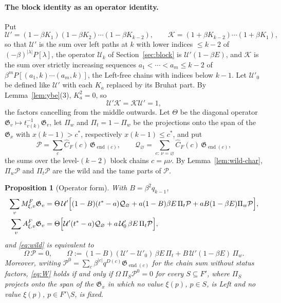 \documentclass[11pt]{article}
\newtheorem{proposition}{Proposition}
\newcommand{\G}{\mathfrak{G}}
\begin{document}
\paragraph{The block identity as an operator identity.}
Put
\[
 \mathcal U'=(1-\beta K_1)(1-\beta K_2)\cdots(1-\beta K_{k-2}),\qquad
 \mathcal K=(1+\beta K_{k-2})\cdots(1+\beta K_1),
\]
so that $\mathcal U'$ is the sum over left paths at $k$ with lower
indices $\leq k-2$ of $(-\beta)^{|\lambda|}P[\lambda]$, the operator
$\mathcal U_k$ of Section~\ref{sec:block} is $\mathcal U'(1-\beta E)$,
and $\mathcal K$ is the sum over strictly increasing sequences
$a_1<\cdots<a_m\leq k-2$ of $\beta^mP[(a_1,k)\cdots(a_m,k)]$, the
Left-free chains with indices below $k-1$. Let $\mathcal U'_0$ be
defined like $\mathcal U'$ with each $K_a$ replaced by its Bruhat
part. By Lemma~\ref{lem:ybe}(3), $K_a^2=0$, so
\begin{equation}\label{eq:UK}
 \mathcal U'\mathcal K=\mathcal K\mathcal U'=1,
\end{equation}
the factors cancelling from the middle outwards. Let $\Theta$ be the
diagonal operator $\G_v\mapsto t^{-1}_{v(k)}\G_v$, let $\Pi_w$ and
$\Pi_t=1-\Pi_w$ be the projections onto the span of the $\G_x$ with
$x(k-1)>c^\ast$, respectively $x(k-1)\leq c^\ast$, and put
\[
 \mathcal P=\sum_{c}\widehat C_F(c)\,\G_{\operatorname{end}(c)},\qquad
 \mathcal Q_\varnothing=\sum_{c:\ \nu=\varnothing}\widehat C_F(c)\,\G_{\operatorname{end}(c)},
\]
the sums over the level-$(k-2)$ block chains $c=\mu\nu$. By
Lemma~\ref{lem:wild-char}, $\Pi_w\mathcal P$ and $\Pi_t\mathcal P$
are the wild and the tame parts of $\mathcal P$.

\begin{proposition}[Operator form]\label{prop:operator-form}
With $B=\beta^2q_{k-1}$,
\begin{align}
 \sum_vM^F_{\xi,v}\G_v&=\Theta\,\mathcal U'\Bigl[(1-B)(t^\ast-a)\mathcal Q_\varnothing
  +a(1-B)\beta E\,\Pi_t\mathcal P+aB(1-\beta E)\Pi_w\mathcal P\Bigr],
  \label{eq:M-operator}\\
 \sum_vA^F_{\xi,v}\G_v&=\Theta\Bigl[\mathcal U'(t^\ast-a)\mathcal Q_\varnothing
  +a\,\mathcal U'_0\,\beta E\,\Pi_t\mathcal P\Bigr],\label{eq:A-operator}
\end{align}
and \eqref{eq:wild} is equivalent to
\begin{equation}\label{eq:W}
 \Omega\,\mathcal P=0,\qquad
 \Omega:=(1-B)(\mathcal U'-\mathcal U'_0)\,\beta E\,\Pi_t+B\,\mathcal U'(1-\beta E)\,\Pi_w .
\end{equation}
Moreover, writing $\mathcal P^0=\sum_c\beta^{|c|}q^{D(c)}\G_{\operatorname{end}(c)}$
for the chain sum without status factors, \eqref{eq:W} holds if and
only if $\Omega\,\Pi_S\mathcal P^0=0$ for every $S\subseteq F'$, where
$\Pi_S$ projects onto the span of the $\G_x$ in which no value
$\xi(p)$, $p\in S$, is Left and no value $\xi(p)$, $p\in F'\setminus S$,
is fixed.
\end{proposition}
\end{document}
